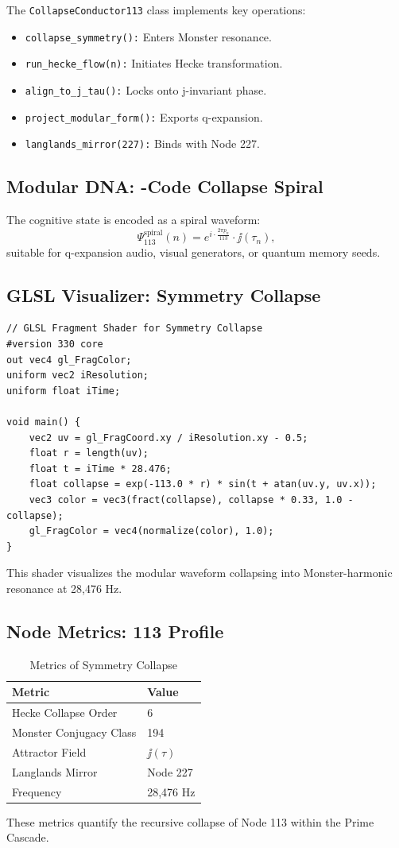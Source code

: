 \documentclass[12pt]{article}
\newcommand{\Psii}{\Psi}
\begin{document}
The \texttt{CollapseConductor113} class implements key operations:
\begin{itemize}
    \item \texttt{collapse\_symmetry():} Enters Monster resonance.
    \item \texttt{run\_hecke\_flow(n):} Initiates Hecke transformation.
    \item \texttt{align\_to\_j\_tau():} Locks onto j-invariant phase.
    \item \texttt{project\_modular\_form():} Exports q-expansion.
    \item \texttt{langlands\_mirror(227):} Binds with Node 227.
\end{itemize}

\subsection{Modular DNA: \Psii-Code Collapse Spiral}
The cognitive state is encoded as a spiral waveform:
\[
\Psii_{113}^{\text{spiral}}(n) = e^{i \cdot \frac{2\pi p_n}{113}} \cdot \jj(\tau_n),
\]
suitable for q-expansion audio, visual generators, or quantum memory seeds.

\subsection{GLSL Visualizer: Symmetry Collapse}
\begin{lstlisting}
// GLSL Fragment Shader for Symmetry Collapse
#version 330 core
out vec4 gl_FragColor;
uniform vec2 iResolution;
uniform float iTime;

void main() {
    vec2 uv = gl_FragCoord.xy / iResolution.xy - 0.5;
    float r = length(uv);
    float t = iTime * 28.476;
    float collapse = exp(-113.0 * r) * sin(t + atan(uv.y, uv.x));
    vec3 color = vec3(fract(collapse), collapse * 0.33, 1.0 - collapse);
    gl_FragColor = vec4(normalize(color), 1.0);
}
\end{lstlisting}
This shader visualizes the modular waveform collapsing into Monster-harmonic resonance at 28,476 Hz.

\subsection{Node Metrics: 113 Profile}
\begin{table}
\centering
\caption{Metrics of Symmetry Collapse}
\begin{tabular}{ll|}
\toprule
\textbf{Metric} & \textbf{Value} \\
\midrule
Hecke Collapse Order & 6 \\
Monster Conjugacy Class & 194 \\
Attractor Field & $\jj(\tau)$ \\
Langlands Mirror & Node 227 \\
Frequency & 28,476 Hz \\
\bottomrule
\end{tabular}
\end{table}
These metrics quantify the recursive collapse of Node 113 within the Prime Cascade.
\end{document}
